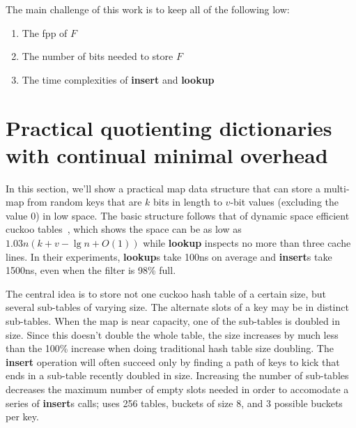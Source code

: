 \documentclass[11pt,letterpaper]{article}
\begin{document}
The main challenge of this work is to keep all of the following low:

\begin{enumerate}
\item The fpp of $F$
\item The number of bits needed to store $F$
\item The time complexities of {\bf insert} and {\bf lookup}
\end{enumerate}

\section{Practical quotienting dictionaries with continual minimal overhead}


In this section, we'll show a practical map data structure that can store a multi-map from random keys that are $k$ bits in length to $v$-bit values (excluding the value $0$) in low space.
The basic structure follows that of dynamic space efficient cuckoo tables~\cite{maier2019dynamic}, which shows the space can be as low as $1.03 n (k + v - \lg n + O(1))$ while {\bf lookup} inspects no more than three cache lines.
In their experiments, {\bf lookup}s take 100ns on average and {\bf insert}s take 1500ns, even when the filter is 98\% full.

The central idea is to store not one cuckoo hash table of a certain size, but several sub-tables of varying size.
The alternate slots of a key may be in distinct sub-tables.
When the map is near capacity, one of the sub-tables is doubled in size.
Since this doesn't double the whole table, the size increases by much less than the 100\% increase when doing traditional hash table size doubling.
The {\bf insert} operation will often succeed only by finding a path of keys to kick that ends in a sub-table recently doubled in size.
Increasing the number of sub-tables decreases the maximum number of empty slots needed in order to accomodate a series of {\bf insert}s calls; \cite{maier2019dynamic} uses 256 tables, buckets of size 8, and 3 possible buckets per key.


\end{document}
